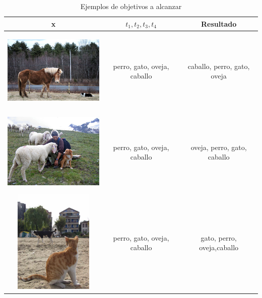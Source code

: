 \begin{table}[ht]
    \centering
    \begin{tabular}{|c|c|c|}
        \hline
        \textbf{x} & \textbf{$t_{1}, t_{2},t_{3} ,t_{4}$} & \textbf{Resultado}\\
        \hline \hline
        \begin{minipage}{.3\textwidth}
              \includegraphics[width=\linewidth, height=40mm]{images/image205.jpg}
        \end{minipage} & perro, gato, oveja, caballo & caballo, perro, gato, oveja \\
        \hline
        \begin{minipage}{.3\textwidth}
              \includegraphics[width=\linewidth, height=40mm]{images/image202.jpg}
        \end{minipage} & perro, gato, oveja, caballo & oveja, perro, gato, caballo \\
        \hline
        \begin{minipage}{.3\textwidth}
              \includegraphics[width=\linewidth, height=50mm]{images/image221.jpg}
        \end{minipage} & perro, gato, oveja, caballo & gato, perro, oveja,caballo \\
        \hline
    \end{tabular}
    \caption{Ejemplos de objetivos a alcanzar}
    \label{tab:objetives}
\end{table}

